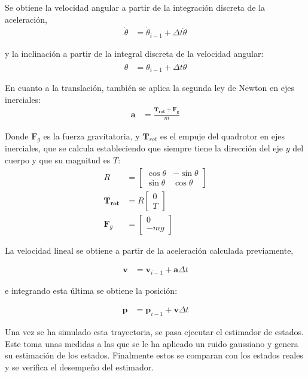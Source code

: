 Se obtiene la velocidad angular a partir de la integración discreta de la aceleración,
\begin{align}
        \dot{\theta} &= \dot{\theta}_{i-1} + \Delta t \ddot{\theta} 
\end{align}

y la inclinación a partir de la integral discreta de la velocidad angular:
\begin{align}
        \theta &= \theta_{i-1} + \Delta t \dot{\theta}
\end{align}

En cuanto a la translación, también se aplica la segunda ley de Newton en ejes inerciales:
\begin{align}
         \bm{a}& = \frac{\bm{T_{rot}}+\bm{F_g}}{m}
\end{align}

Donde $\bm{F}_g$ es la fuerza gravitatoria, y $\bm{T}_{rot}$ es el empuje del quadrotor en ejes inerciales, que se calcula estableciendo que siempre tiene la dirección del eje $y$ del cuerpo y que su magnitud es $T$:
\begin{align}
        R &= 
\begin{bmatrix}
\cos{\theta}& -\sin{\theta}\\
\sin{\theta} & \cos{\theta}
\end{bmatrix}\\
         \bm{T_{rot}}&= R  \begin{bmatrix}0\\ T \end{bmatrix}\\
         \bm{F}_g&= \begin{bmatrix}0\\ -m g \end{bmatrix}
\end{align}

La velocidad lineal se obtiene a partir de la aceleración calculada previamente, 

\begin{align}
         \bm{v}& = \bm{v}_{i-1} + \bm{a}\Delta t  
\end{align}

e integrando esta última se obtiene la posición:
 
\begin{align}
        \bm{p} &= \bm{p}_{i-1} + \bm{v}\Delta t  
\end{align}




Una vez se ha simulado esta trayectoria, se pasa ejecutar el estimador de estados. Este toma unas medidas a las que se le ha aplicado un ruido gaussiano y genera su estimación de los estados. Finalmente estos se comparan con los estados reales y se verifica el desempeño del estimador. 

